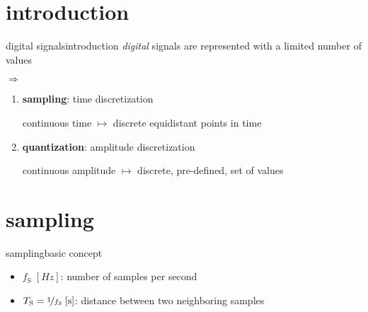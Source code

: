     \section[intro]{introduction}
        \begin{frame}{digital signals}{introduction}
            \textit{digital} signals are represented with a limited number of values
            
            \bigskip
            $\Rightarrow$
            \begin{enumerate}
                \item	{\textbf{sampling}}: time discretization
                
                continuous time $\mapsto$ discrete equidistant points in time 
                
                
                \smallskip
                \item	\textbf{quantization}: amplitude discretization
                
                continuous amplitude $\mapsto$ discrete, pre-defined, set of values
            \end{enumerate}
        \end{frame}
        
    \section{sampling}
        \begin{frame}{sampling}{basic concept}
            \vspace{-3mm}
                
            \begin{itemize}
                \item   $f_\mathrm{S}\;[\unit{Hz}]$: number of samples per second
                \item   $T_\mathrm{S} = \nicefrac{1}{f_\mathrm{S}}\;[\unit{s}]$: distance between two neighboring samples
            \end{itemize}
        \end{frame}
            
